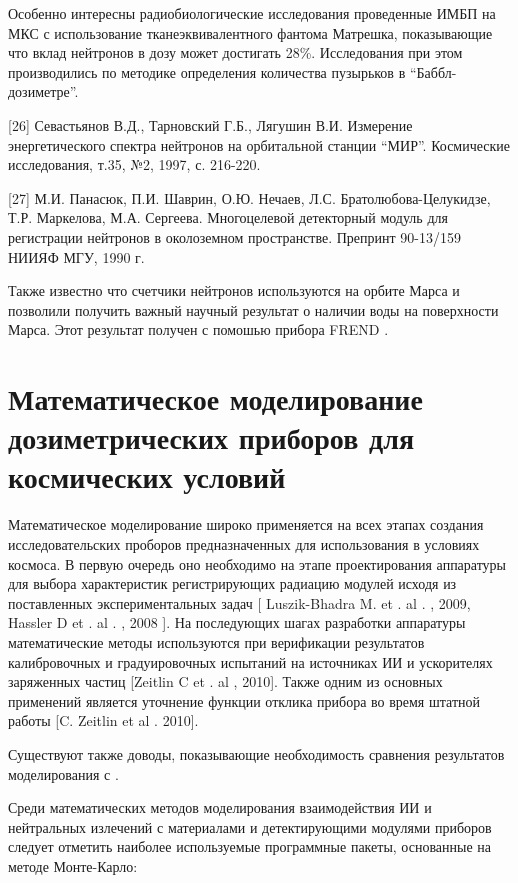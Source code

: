 Особенно интересны радиобиологические исследования проведенные ИМБП \cite{Shurshakov2016} на МКС с использование тканеэквивалентного фантома Матрешка, показывающие что вклад нейтронов в дозу может достигать 28\%.  Исследования при этом производились по методике определения количества пузырьков в ``Баббл-дозиметре''.

[26]  Севастьянов В.Д., Тарновский Г.Б., Лягушин В.И.  Измерение энергетического спектра нейтронов на орбитальной станции “МИР”.  Космические исследования, т.35, №2, 1997, с. 216-220.

[27]  М.И. Панасюк, П.И. Шаврин, О.Ю. Нечаев, Л.С. Братолюбова-Целукидзе, Т.Р. Маркелова, М.А. Сергеева. Многоцелевой детекторный модуль для регистрации нейтронов в околоземном пространстве. Препринт 90-13/159 НИИЯФ МГУ, 1990 г.

Также известно что счетчики нейтронов используются на орбите Марса и позволили получить важный научный результат о наличии воды на поверхности Марса.  Этот  результат получен с помошью прибора FREND \cite{Sanin2012}.

\section{Математическое моделирование дозиметрических приборов для космических условий}

Математическое моделирование широко применяется на всех этапах создания исследовательских проборов предназначенных для использования в условиях космоса. В первую очередь оно необходимо на этапе проектирования аппаратуры для выбора характеристик регистрирующих радиацию модулей исходя из поставленных экспериментальных задач [ Luszik-Bhadra M.  et . al . ,  2009,  Hassler  D et .  al . ,  2008 ]. На последующих шагах разработки аппаратуры математические методы используются при верификации результатов калибровочных и градуировочных испытаний на источниках ИИ и ускорителях заряженных частиц [Zeitlin C et . al ,  2010]. Также одним из основных применений является уточнение функции отклика прибора во время штатной работы [C. Zeitlin et al . 2010]. 

Существуют также доводы, показывающие необходимость сравнения результатов моделирования с \cite{Matthia}.


Среди математических методов моделирования взаимодействия ИИ и нейтральных излечений с материалами и детектирующими модулями приборов следует отметить наиболее используемые программные пакеты, основанные на методе Монте-Карло:


